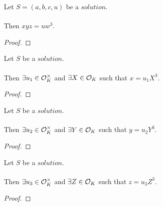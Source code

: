 \begin{lemma}
    \label{lmm:x_mul_y_mul_z_eq_u_w_pow_three}
    \leanok
    Let $S=(a,b,c,u)$ be a $solution$.\\\\
    Then $x y z = u w^3$.
\end{lemma}
\begin{proof}
    \leanok
\end{proof}

\begin{lemma}
    \label{lmm:x_eq_unit_mul_cube}
    \leanok
    Let $S$ be a $solution$.\\\\
    Then $\exists u_1 \in \mathcal{O}^\times_K$ and $\exists X \in \mathcal{O}_K$
    such that $x = u_1 X^3$.
\end{lemma}
\begin{proof}
    \leanok
\end{proof}

\begin{lemma}
    \label{lmm:y_eq_unit_mul_cube}
    \leanok
    Let $S$ be a $solution$.\\\\
    Then $\exists u_2 \in \mathcal{O}^\times_K$ and $\exists Y \in \mathcal{O}_K$
    such that $y = u_2 Y^3$.
\end{lemma}
\begin{proof}
    \leanok
\end{proof}

\begin{lemma}
    \label{lmm:z_eq_unit_mul_cube}
    \leanok
    Let $S$ be a $solution$.\\\\
    Then $\exists u_3 \in \mathcal{O}^\times_K$ and $\exists Z \in \mathcal{O}_K$
    such that $z = u_3  Z^3$.
\end{lemma}
\begin{proof}
    \leanok
\end{proof}

